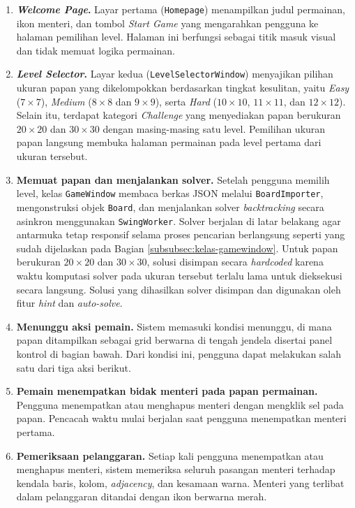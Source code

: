 \begin{enumerate}
	\item \textbf{\textit{Welcome Page}.} Layar pertama (\texttt{Homepage}) menampilkan judul permainan, ikon menteri, dan tombol \textit{Start Game} yang mengarahkan pengguna ke halaman pemilihan level. Halaman ini berfungsi sebagai titik masuk visual dan tidak memuat logika permainan.
	
	\item \textbf{\textit{Level Selector}.} Layar kedua (\texttt{LevelSelectorWindow}) menyajikan pilihan ukuran papan yang dikelompokkan berdasarkan tingkat kesulitan, yaitu \textit{Easy} ($7 \times 7$), \textit{Medium} ($8 \times 8$ dan $9 \times 9$), serta \textit{Hard} ($10 \times 10$, $11 \times 11$, dan $12 \times 12$). Selain itu, terdapat kategori \textit{Challenge} yang menyediakan papan berukuran $20 \times 20$ dan $30 \times 30$ dengan masing-masing satu level. Pemilihan ukuran papan langsung membuka halaman permainan pada level pertama dari ukuran tersebut.
	
	\item \textbf{Memuat papan dan menjalankan solver.} Setelah pengguna memilih level, kelas \texttt{GameWindow} membaca berkas JSON melalui \texttt{BoardImporter}, mengonstruksi objek \texttt{Board}, dan menjalankan solver \textit{backtracking} secara asinkron menggunakan \texttt{SwingWorker}. Solver berjalan di latar belakang agar antarmuka tetap responsif selama proses pencarian berlangsung seperti yang sudah dijelaskan pada Bagian \ref{subsubsec:kelas-gamewindow}. Untuk papan berukuran $20 \times 20$ dan $30 \times 30$, solusi disimpan secara \textit{hardcoded} karena waktu komputasi solver pada ukuran tersebut terlalu lama untuk dieksekusi secara langsung. Solusi yang dihasilkan solver disimpan dan digunakan oleh fitur \textit{hint} dan \textit{auto-solve}.
	
	\item \textbf{Menunggu aksi pemain.} Sistem memasuki kondisi menunggu, di mana papan ditampilkan sebagai grid berwarna di tengah jendela disertai panel kontrol di bagian bawah. Dari kondisi ini, pengguna dapat melakukan salah satu dari tiga aksi berikut.
	
	\item \textbf{Pemain menempatkan bidak menteri pada papan permainan.} Pengguna menempatkan atau menghapus menteri dengan mengklik sel pada papan. Pencacah waktu mulai berjalan saat pengguna menempatkan menteri pertama.
	
	\item \textbf{Pemeriksaan pelanggaran.} Setiap kali pengguna menempatkan atau menghapus menteri, sistem memeriksa seluruh pasangan menteri terhadap kendala baris, kolom, \textit{adjacency}, dan kesamaan warna. Menteri yang terlibat dalam pelanggaran ditandai dengan ikon berwarna merah.
	

\end{enumerate}
